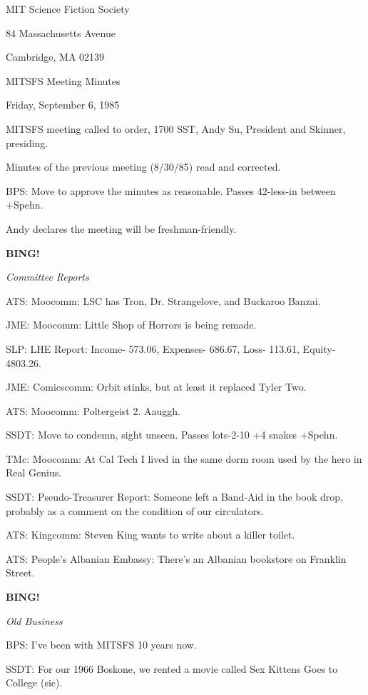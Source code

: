 \documentclass[12pt]{article}
\newcommand{\bing}{{\bf BING!} }
\newcommand{\goto}[1]{\bing \vskip 12pt \centerline{{\em{#1}}}}
\begin{document}
\begin{center}

MIT Science Fiction Society 

84 Massachusetts Avenue

Cambridge, MA 02139

\vspace{12pt}

MITSFS Meeting Minutes 

Friday, September 6, 1985

\end{center}
 
\vspace{18pt}

\setlength{\parskip}{6pt}

\noindent
MITSFS meeting called to order, 1700 SST,
Andy Su, President and Skinner, presiding.

Minutes of the previous meeting (8/30/85) read and corrected.

BPS: Move to approve the minutes as reasonable. Passes 42-less-in between +Spehn.

Andy declares the meeting will be freshman-friendly.

\goto{Committee Reports}

ATS: Moocomm: LSC has Tron, Dr. Strangelove, and Buckaroo Banzai.

JME: Moocomm: Little Shop of Horrors is being remade.

SLP: LHE Report: Income- 573.06, Expenses- 686.67, Loss- 113.61, Equity- 4803.26.

JME: Comicscomm: Orbit stinks, but at least it replaced Tyler Two.

ATS: Moocomm: Poltergeist 2. Aauggh.

SSDT: Move to condemn, sight unseen. Passes lots-2-10 +4 snakes +Spehn.

TMc: Moocomm: At Cal Tech I lived in the same dorm room used by the hero in Real Genius.

SSDT: Pseudo-Treasurer Report: Someone left a Band-Aid in the book drop, probably as a comment on the condition of our circulators.

ATS: Kingcomm: Steven King wants to write about a killer toilet.

ATS: People's Albanian Embassy: There's an Albanian bookstore on Franklin Street.

\goto{Old Business}

BPS: I've been with MITSFS 10 years now.

SSDT: For our 1966 Boskone, we rented a movie called Sex Kittens Goes to College (sic).
\end{document}
